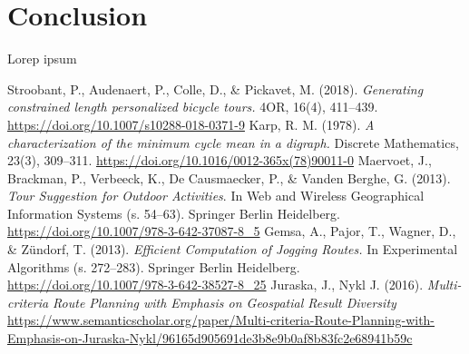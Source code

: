 \documentclass{ctuthesis}
\begin{document}
\chapter{Conclusion}
Lorep ipsum \cite{stroobant}
\begin{thebibliography}{1}
	Stroobant, P., Audenaert, P., Colle, D., \& Pickavet, M. (2018). \emph{Generating constrained length personalized bicycle tours.} 4OR, 16(4), 411–439. \url{https://doi.org/10.1007/s10288-018-0371-9} 
	Karp, R. M. (1978). \emph{A characterization of the minimum cycle mean in a digraph.} Discrete Mathematics, 23(3), 309–311. \url{https://doi.org/10.1016/0012-365x(78)90011-0} 
	Maervoet, J., Brackman, P., Verbeeck, K., De Causmaecker, P., \& Vanden Berghe, G. (2013). \emph{Tour Suggestion for Outdoor Activities}. In Web and Wireless Geographical Information Systems (s. 54–63). Springer Berlin Heidelberg. \url{https://doi.org/10.1007/978-3-642-37087-8_5} 
	Gemsa, A., Pajor, T., Wagner, D., \& Zündorf, T. (2013). \emph{Efficient Computation of Jogging Routes.} In Experimental Algorithms (s. 272–283). Springer Berlin Heidelberg. \url{https://doi.org/10.1007/978-3-642-38527-8_25} 
	 Juraska, J., Nykl J. (2016). \emph{Multi-criteria Route Planning with Emphasis on Geospatial Result Diversity} \url{https://www.semanticscholar.org/paper/Multi-criteria-Route-Planning-with-Emphasis-on-Juraska-Nykl/96165d905691de3b8e9b0af8b83fc2e68941b59c}
\end{thebibliography}
\end{document}
